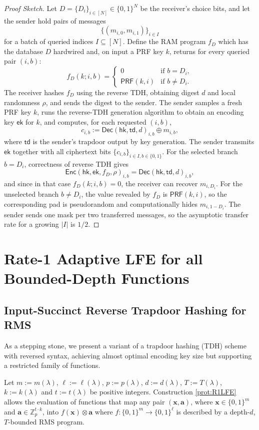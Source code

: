 \documentclass{theoretics}
\newcommand{\Z}{\mathbb{Z}}
\renewcommand{\sec}{\ensuremath{\lambda}}
\newcommand{\algofont}[1]{\ensuremath{\mathsf{#1}}}
\newcommand{\Enc}{{\algofont{Enc}}}
\newcommand{\Dec}{{\algofont{Dec}}}
\begin{document}
{\begin{proof}[Proof Sketch]
Let $D=\{D_i\}_{i\in[N]} \in \{0,1\}^N$ be the receiver's choice bits, and let the
sender hold pairs of messages
\[
\{(m_{i,0},m_{i,1})\}_{i\in I}
\]
for a batch of queried indices $I \subseteq [N]$. Define the RAM program $f_D$ which has the database $D$ hardwired and, on input a PRF key $k$, returns for every queried pair $(i,b)$:
\[
f_D(k;i,b)=
\begin{cases}
0 & \text{if } b = D_i,\\
\mathsf{PRF}(k,i) & \text{if } b \neq D_i.
\end{cases}
\]
The receiver hashes $f_D$ using the reverse TDH, obtaining digest $d$ and local
randomness $\rho$, and sends the digest to the sender. The sender samples a fresh PRF key $k$, runs the reverse-TDH generation algorithm
to obtain an encoding key $\mathsf{ek}$ for $k$, and computes, for each requested
$(i,b)$,
\[
c_{i,b} := \Dec(\mathsf{hk},\mathsf{td},d)_{i,b} \oplus m_{i,b},
\]
where $\mathsf{td}$ is the sender's trapdoor output by key generation.
The sender transmits $\mathsf{ek}$ together with all ciphertext bits
$\{c_{i,b}\}_{i\in I,b\in\{0,1\}}$. For the selected branch $b=D_i$, correctness of reverse TDH gives
\[
\Enc(\mathsf{hk},\mathsf{ek},f_D,\rho)_{i,b}
=
\Dec(\mathsf{hk},\mathsf{td},d)_{i,b},
\]
and since in that case $f_D(k;i,b)=0$, the receiver can recover
$m_{i,D_i}$.
For the unselected branch $b \neq D_i$, the value revealed by $f_D$ is
$\mathsf{PRF}(k,i)$, so the corresponding pad is pseudorandom and computationally hides
$m_{i,1-D_i}$.
The sender sends one mask per two transferred messages, so the asymptotic transfer
rate for a growing $|I|$ is $1/2$.
\end{proof}}
\section{Rate-1 Adaptive LFE for all Bounded-Depth Functions}

\subsection{Input-Succinct Reverse Trapdoor Hashing for RMS}\label{sec:weakTDH}

As a stepping stone, we present a variant of a trapdoor hashing (TDH) scheme \cite{C:DGIMMO19} with reversed syntax, achieving almost optimal encoding key size but supporting a restricted family of functions. 

Let $m:=m(\sec)$, $\ell:=\ell(\sec)$, $p:=p(\sec)$, $d:=d(\sec)$, $T:=T(\sec)$, $k:=k(\sec)$ and $t:=t(\sec)$ be positive integers. Construction \ref{prot:R1LFE} allows the evaluation of functions that map any pair $(\mathbf{x}, \mathbf{a})$, where $\mathbf{x}\in\{0, 1\}^m$ and $\mathbf{a}\in\Z_p^{t\cdot k}$, into $f(\mathbf{x})\otimes \mathbf{a}$ where $f:\{0, 1\}^m\rightarrow \{0, 1\}^\ell$ is described by a depth-$d$, $T$-bounded RMS program. 
\end{document}
